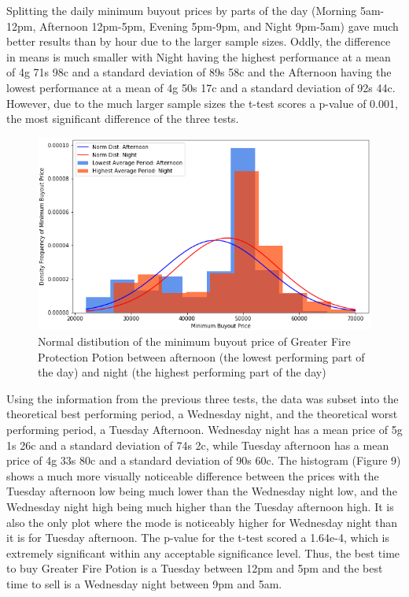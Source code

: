 \documentclass[sigconf]{acmart}
\begin{document}
Splitting the daily minimum buyout prices by parts of the day (Morning 5am-12pm, Afternoon 12pm-5pm, Evening 5pm-9pm, and Night 9pm-5am) gave much better results than by hour due to the larger sample sizes. Oddly, the difference in means is much smaller with Night having the highest performance at a mean of 4g 71s 98c and a standard deviation of 89s 58c and the Afternoon having the lowest performance at a mean of 4g 50s 17c and a standard deviation of 92s 44c. However, due to the much larger sample sizes the t-test scores a p-value of 0.001, the most significant difference of the three tests.

\begin{figure}[h]
  \centering
  \includegraphics[width=\linewidth]{pod_hist}
  \caption{Normal distibution of the minimum buyout price of Greater Fire Protection Potion between afternoon (the lowest performing part of the day) and night (the highest performing part of the day)}
\end{figure}

Using the information from the previous three tests, the data was subset into the theoretical best performing period, a Wednesday night, and the theoretical worst performing period, a Tuesday Afternoon. Wednesday night has a mean price of 5g 1s 26c and a standard deviation of 74s 2c, while Tuesday afternoon has a mean price of 4g 33s 80c and a standard deviation of 90s 60c. The histogram (Figure 9) shows a much more visually noticeable difference between the prices with the Tuesday afternoon low being much lower than the Wednesday night low, and the Wednesday night high being much higher than the Tuesday afternoon high. It is also the only plot where the mode is noticeably higher for Wednesday night than it is for Tuesday afternoon. The p-value for the t-test scored a 1.64e-4, which is extremely significant within any acceptable significance level. Thus, the best time to buy Greater Fire Potion is a Tuesday between 12pm and 5pm and the best time to sell is a Wednesday night between 9pm and 5am.
\end{document}
